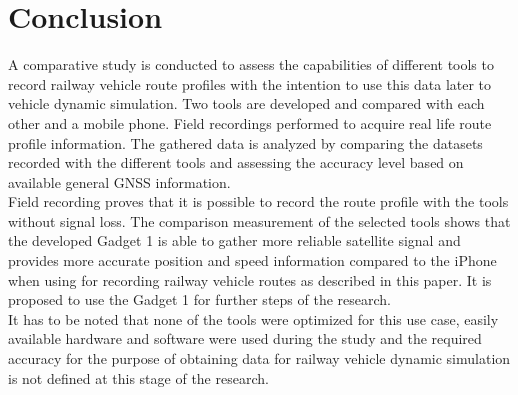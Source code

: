 \documentclass{article}
\begin{document}
	\section{Conclusion}
		A comparative study is conducted to assess the capabilities of different tools to record railway vehicle route profiles with the intention to use this data later to vehicle dynamic simulation. Two tools are developed and compared with each other and a mobile phone. Field recordings performed to acquire real life route profile information. The gathered data is analyzed by comparing the datasets recorded with the different tools and assessing the accuracy level based on available general GNSS information. \\
		Field recording proves that it is possible to record the route profile with the tools without signal loss. The comparison measurement of the selected tools shows that the developed Gadget 1 is able to gather more reliable satellite signal and provides more accurate position and speed information compared to the iPhone when using for recording railway vehicle routes as described in this paper. It is proposed to use the Gadget 1 for further steps of the research.\\
		It has to be noted that none of the tools were optimized for this use case, easily available hardware and software were used during the study and the required accuracy for the purpose of obtaining data for railway vehicle dynamic simulation is not defined at this stage of the research.
	\newpage
	\printbibliography
\end{document}
